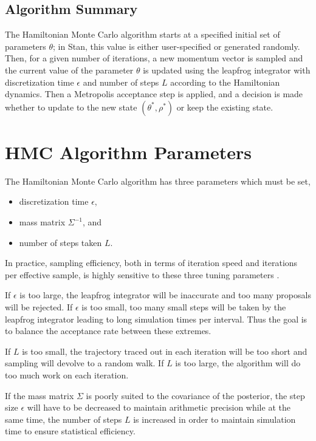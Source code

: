 \subsection{Algorithm Summary}

The Hamiltonian Monte Carlo algorithm starts at a specified initial
set of parameters $\theta$; in Stan, this value is either
user-specified or generated randomly. Then, for a given number of
iterations, a new momentum vector is sampled and the current value of
the parameter $\theta$ is updated using the leapfrog integrator with
discretization time $\epsilon$ and number of steps $L$ according to
the Hamiltonian dynamics. Then a Metropolis acceptance step is
applied, and a decision is made whether to update to the new state
$(\theta^{*},\rho^{*})$ or keep the existing state.


\section{HMC Algorithm Parameters}

The Hamiltonian Monte Carlo algorithm has three parameters which must
be set,
%
\begin{itemize}
\item discretization time $\epsilon$,
\item mass matrix $\Sigma^{-1}$, and
\item number of steps taken $L$.
\end{itemize}
%
In practice, sampling efficiency, both in terms of iteration speed and
iterations per effective sample, is highly sensitive to these three
tuning parameters \citep{Neal:2011,Hoffman-Gelman:2014}.

If $\epsilon$ is too large, the leapfrog integrator will be inaccurate
and too many proposals will be rejected. If $\epsilon$ is too small,
too many small steps will be taken by the leapfrog integrator leading
to long simulation times per interval. Thus the goal is to balance the
acceptance rate between these extremes.

If $L$ is too small, the trajectory traced out in each iteration will
be too short and sampling will devolve to a random walk.  If $L$ is
too large, the algorithm will do too much work on each iteration.

If the mass matrix $\Sigma$ is poorly suited to the covariance of the
posterior, the step size $\epsilon$ will have to be decreased to
maintain arithmetic precision while at the same time, the number of
steps $L$ is increased in order to maintain simulation time to ensure
statistical efficiency.

